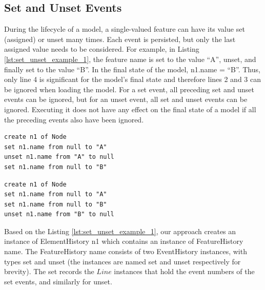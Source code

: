 \subsection{Set and Unset Events}
\label{subsec:set_and_unset_operations}
During the lifecycle of a model, a single-valued feature can have its value set (assigned) or unset many times. Each event is persisted, but only the last assigned value needs to be considered. For example, in Listing \ref{lst:set_unset_example_1}, the feature \textsf{name} is set to the value ``A'', unset, and finally set to the value ``B''.  In the final state of the model, \textsf{n1.name} = ``B''. Thus, only line 4 is significant for the model's final state and therefore lines 2 and 3 can be ignored when loading the model. For a \textsf{set} event, all preceding \textsf{set} and \textsf{unset} events can be ignored, but for an \textsf{unset} event, all \textsf{set} and \textsf{unset} events can be ignored. Executing it does not have any effect on the final state of a model if all the preceding events also have been ignored.

\vspace{-20pt}
\begin{minipage}[t]{0.49\linewidth}
\begin{lstlisting}[style=eol,caption={A CBP representation of attribute \textsf{name} assignments ended with SET.},label=lst:set_unset_example_1]
create n1 of Node
set n1.name from null to "A"
unset n1.name from "A" to null
set n1.name from null to "B"
\end{lstlisting}
\end{minipage}
\hfill
\begin{minipage}[t]{0.49\linewidth}
\begin{lstlisting}[style=eol,caption={A CBP representation of attribute \textsf{name} assignments ended with UNSET.},label=lst:set_unset_example_2]
create n1 of Node
set n1.name from null to "A"
set n1.name from null to "B"
unset n1.name from "B" to null
\end{lstlisting}
\end{minipage}

Based on the Listing \ref{lst:set_unset_example_1}, our approach creates an instance of \textsf{ElementHistory} \textsf{n1} which contains an instance of \textsf{FeatureHistory} \textsf{name}. The \textsf{FeatureHistory} \textsf{name} consists of two \textsf{EventHistory} instances, with types \textsf{set} and \textsf{unset} (the instances are named \textsf{set} and \textsf{unset} respectively for brevity). The \textsf{set} records the $Line$ instances that hold the event numbers of the \textsf{set} events, and similarly for \textsf{unset}.

